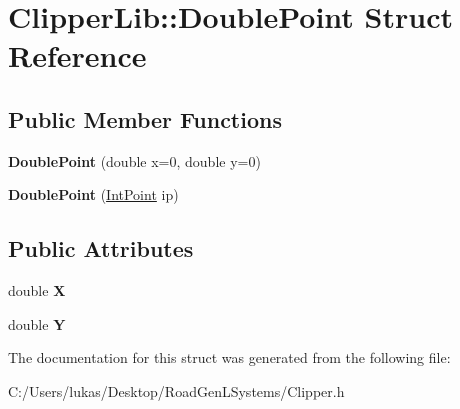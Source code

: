 \hypertarget{struct_clipper_lib_1_1_double_point}{}\section{Clipper\+Lib\+:\+:Double\+Point Struct Reference}
\label{struct_clipper_lib_1_1_double_point}
\subsection*{Public Member Functions}
\begin{DoxyCompactItemize}
\item 
\hypertarget{struct_clipper_lib_1_1_double_point_a3ccbea6aaf488e0a2d8ac499d2676093}{}\label{struct_clipper_lib_1_1_double_point_a3ccbea6aaf488e0a2d8ac499d2676093} 
{\bfseries Double\+Point} (double x=0, double y=0)
\item 
\hypertarget{struct_clipper_lib_1_1_double_point_afd33c9193b3cf11536936dc933b965a4}{}\label{struct_clipper_lib_1_1_double_point_afd33c9193b3cf11536936dc933b965a4} 
{\bfseries Double\+Point} (\hyperlink{struct_clipper_lib_1_1_int_point}{Int\+Point} ip)
\end{DoxyCompactItemize}
\subsection*{Public Attributes}
\begin{DoxyCompactItemize}
\item 
\hypertarget{struct_clipper_lib_1_1_double_point_a675837cc05f20447313789b82d84ad31}{}\label{struct_clipper_lib_1_1_double_point_a675837cc05f20447313789b82d84ad31} 
double {\bfseries X}
\item 
\hypertarget{struct_clipper_lib_1_1_double_point_a49774a93540882d88448badf37034454}{}\label{struct_clipper_lib_1_1_double_point_a49774a93540882d88448badf37034454} 
double {\bfseries Y}
\end{DoxyCompactItemize}


The documentation for this struct was generated from the following file\+:\begin{DoxyCompactItemize}
\item 
C\+:/\+Users/lukas/\+Desktop/\+Road\+Gen\+L\+Systems/Clipper.\+h\end{DoxyCompactItemize}
